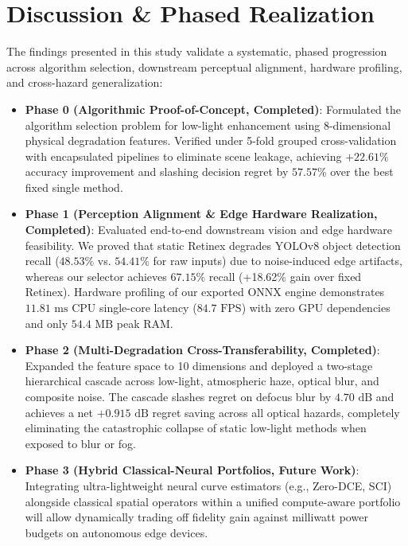 \documentclass[journal]{IEEEtran}
\begin{document}
\section{Discussion \& Phased Realization}
The findings presented in this study validate a systematic, phased progression across algorithm selection, downstream perceptual alignment, hardware profiling, and cross-hazard generalization:
\begin{itemize}
    \item \textbf{Phase 0 (Algorithmic Proof-of-Concept, Completed)}: Formulated the algorithm selection problem for low-light enhancement using 8-dimensional physical degradation features. Verified under 5-fold grouped cross-validation with encapsulated pipelines to eliminate scene leakage, achieving $+22.61\%$ accuracy improvement and slashing decision regret by $57.57\%$ over the best fixed single method.
    \item \textbf{Phase 1 (Perception Alignment \& Edge Hardware Realization, Completed)}: Evaluated end-to-end downstream vision and edge hardware feasibility. We proved that static Retinex degrades YOLOv8 object detection recall ($48.53\%$ vs. $54.41\%$ for raw inputs) due to noise-induced edge artifacts, whereas our selector achieves $67.15\%$ recall (+18.62\% gain over fixed Retinex). Hardware profiling of our exported ONNX engine demonstrates $11.81\text{ ms}$ CPU single-core latency ($84.7\text{ FPS}$) with zero GPU dependencies and only $54.4\text{ MB}$ peak RAM.
    \item \textbf{Phase 2 (Multi-Degradation Cross-Transferability, Completed)}: Expanded the feature space to 10 dimensions and deployed a two-stage hierarchical cascade across low-light, atmospheric haze, optical blur, and composite noise. The cascade slashes regret on defocus blur by $4.70\text{ dB}$ and achieves a net $+0.915\text{ dB}$ regret saving across all optical hazards, completely eliminating the catastrophic collapse of static low-light methods when exposed to blur or fog.
    \item \textbf{Phase 3 (Hybrid Classical-Neural Portfolios, Future Work)}: Integrating ultra-lightweight neural curve estimators (e.g., Zero-DCE, SCI) alongside classical spatial operators within a unified compute-aware portfolio will allow dynamically trading off fidelity gain against milliwatt power budgets on autonomous edge devices.
\end{itemize}
\end{document}
